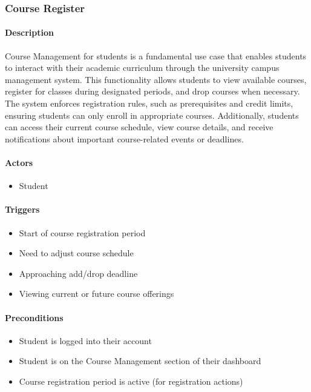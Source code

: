 \subsubsection{Course Register}

\paragraph{Description}
Course Management for students is a fundamental use case that enables students to interact with their academic curriculum through the university campus management system. This functionality allows students to view available courses, register for classes during designated periods, and drop courses when necessary. The system enforces registration rules, such as prerequisites and credit limits, ensuring students can only enroll in appropriate courses. Additionally, students can access their current course schedule, view course details, and receive notifications about important course-related events or deadlines.

\paragraph{Actors}
\begin{itemize}
    \item Student
\end{itemize}

\paragraph{Triggers}
\begin{itemize}
    \item Start of course registration period
    \item Need to adjust course schedule
    \item Approaching add/drop deadline
    \item Viewing current or future course offerings
\end{itemize}

\paragraph{Preconditions}
\begin{itemize}
    \item Student is logged into their account
    \item Student is on the Course Management section of their dashboard
    \item Course registration period is active (for registration actions)
\end{itemize}

